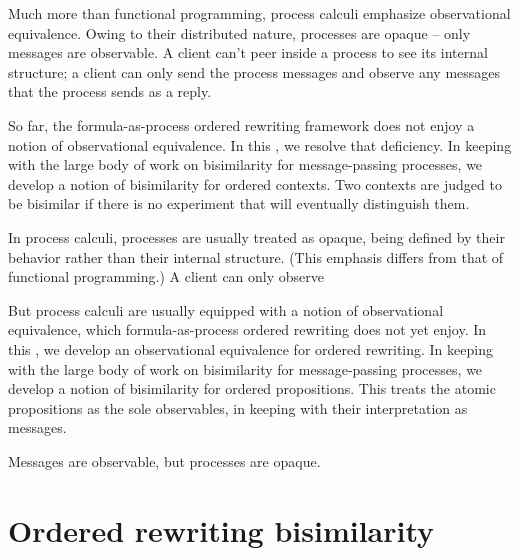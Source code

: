 Much more than functional programming, process calculi emphasize observational equivalence.
Owing to their distributed nature, processes are opaque -- only messages are observable.
A client can't peer inside a process to see its internal structure;
a client can only send the process messages and observe any messages that the process sends as a reply.

So far, the formula-as-process ordered rewriting framework does not enjoy a notion of observational equivalence.
In this , we resolve that deficiency.
In keeping with the large body of work on bisimilarity for message-passing processes\autocite{??}, we develop a notion of bisimilarity for ordered contexts.
Two contexts are judged to be bisimilar if there is no experiment that will eventually distinguish them.

In process calculi, processes are usually treated as opaque, being defined by their behavior rather than their internal structure.
(This emphasis differs from that of functional programming.)
A client can only observe

But process calculi are usually equipped with a notion of observational equivalence, which formula-as-process ordered rewriting does not yet enjoy.
In this , we develop an observational equivalence for ordered rewriting.
In keeping with the large body of work on bisimilarity for message-passing processes\autocite{??}, we develop a notion of bisimilarity for ordered propositions.
This  treats the atomic propositions as the sole observables, in keeping with their interpretation as messages.

Messages are observable, but processes are opaque.



\section{Ordered rewriting bisimilarity}



